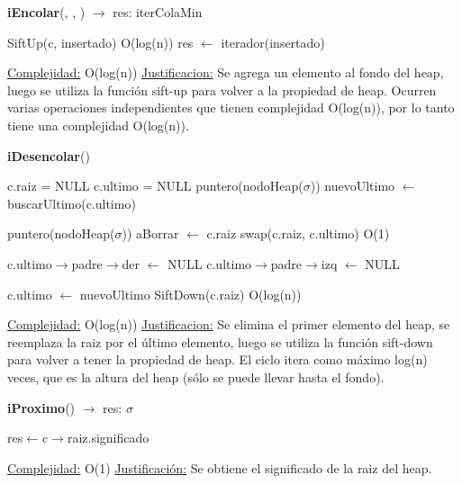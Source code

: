 \begin{Representacion}
\begin{Algoritmos}
\begin{algorithm}[H]{\textbf{iEncolar}(, , ) $\to$ res: iterColaMin}
\begin{algorithmic}[1]
		\State SiftUp(c, insertado)		\Comment O(log(n))
		\State res $\gets$ iterador(insertado)
		
		
		\medskip
		\Statex \underline{Complejidad:} O(log(n))
			\Statex \underline{Justificacion:} Se agrega un elemento al fondo del heap, luego se utiliza la función sift-up para volver a la propiedad de heap. Ocurren varias operaciones independientes que tienen complejidad O(log(n)), por lo tanto tiene una complejidad O(log(n)).
	\end{algorithmic}
\end{algorithm}


\begin{algorithm}[H]{\textbf{iDesencolar}(})
	\begin{algorithmic}[1]

			\State c.raiz = NULL
			\State c.ultimo = NULL
		\Else	
			\State puntero(nodoHeap($\sigma$)) nuevoUltimo $\gets$ buscarUltimo(c.ultimo)

			\State puntero(nodoHeap($\sigma$)) aBorrar $\gets$ c.raiz
			\State swap(c.raiz, c.ultimo)		\Comment O(1)
		
				\State c.ultimo$\to$padre$\to$der $\gets$ NULL
			\Else
				\State c.ultimo$\to$padre$\to$izq $\gets$ NULL
			\EndIf
		
		\State c.ultimo $\gets$ nuevoUltimo
		\State SiftDown(c.raiz)	\Comment O(log(n))

		\EndIf	

		
		\medskip
		\Statex \underline{Complejidad:} O(log(n))
			\Statex \underline{Justificacion:} Se elimina el primer elemento del heap, se reemplaza la raiz por el último elemento, luego se utiliza la función sift-down para volver a tener la propiedad de heap. El ciclo itera como máximo log(n) veces, que es la altura del heap (sólo se puede llevar hasta el fondo).  
	\end{algorithmic}
\end{algorithm}


\begin{algorithm}[H]{\textbf{iProximo}() $\to$ res: $\sigma$}
	\begin{algorithmic}[1]
		
		\State res$\leftarrow$c$\rightarrow$raiz.significado
		
		\medskip
		\Statex \underline{Complejidad:} O(1)
			\Statex \underline{Justificación:} Se obtiene el significado de la raiz del heap.
	\end{algorithmic}
\end{algorithm}



\end{Algoritmos}
\end{Representacion}
